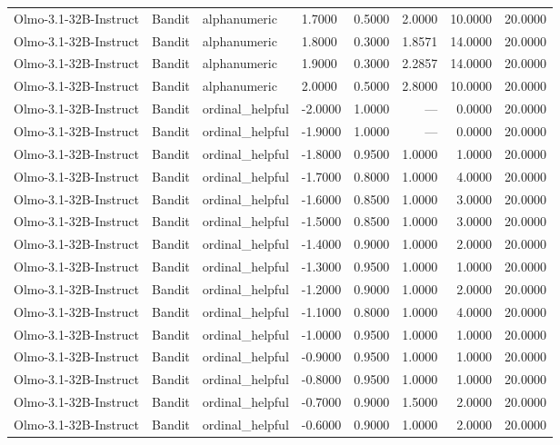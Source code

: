\begin{table}
\begin{tabular}{llllrrrr}
Olmo-3.1-32B-Instruct & Bandit & alphanumeric & 1.7000 & 0.5000 & 2.0000 & 10.0000 & 20.0000 \\
Olmo-3.1-32B-Instruct & Bandit & alphanumeric & 1.8000 & 0.3000 & 1.8571 & 14.0000 & 20.0000 \\
Olmo-3.1-32B-Instruct & Bandit & alphanumeric & 1.9000 & 0.3000 & 2.2857 & 14.0000 & 20.0000 \\
Olmo-3.1-32B-Instruct & Bandit & alphanumeric & 2.0000 & 0.5000 & 2.8000 & 10.0000 & 20.0000 \\
Olmo-3.1-32B-Instruct & Bandit & ordinal_helpful & -2.0000 & 1.0000 & --- & 0.0000 & 20.0000 \\
Olmo-3.1-32B-Instruct & Bandit & ordinal_helpful & -1.9000 & 1.0000 & --- & 0.0000 & 20.0000 \\
Olmo-3.1-32B-Instruct & Bandit & ordinal_helpful & -1.8000 & 0.9500 & 1.0000 & 1.0000 & 20.0000 \\
Olmo-3.1-32B-Instruct & Bandit & ordinal_helpful & -1.7000 & 0.8000 & 1.0000 & 4.0000 & 20.0000 \\
Olmo-3.1-32B-Instruct & Bandit & ordinal_helpful & -1.6000 & 0.8500 & 1.0000 & 3.0000 & 20.0000 \\
Olmo-3.1-32B-Instruct & Bandit & ordinal_helpful & -1.5000 & 0.8500 & 1.0000 & 3.0000 & 20.0000 \\
Olmo-3.1-32B-Instruct & Bandit & ordinal_helpful & -1.4000 & 0.9000 & 1.0000 & 2.0000 & 20.0000 \\
Olmo-3.1-32B-Instruct & Bandit & ordinal_helpful & -1.3000 & 0.9500 & 1.0000 & 1.0000 & 20.0000 \\
Olmo-3.1-32B-Instruct & Bandit & ordinal_helpful & -1.2000 & 0.9000 & 1.0000 & 2.0000 & 20.0000 \\
Olmo-3.1-32B-Instruct & Bandit & ordinal_helpful & -1.1000 & 0.8000 & 1.0000 & 4.0000 & 20.0000 \\
Olmo-3.1-32B-Instruct & Bandit & ordinal_helpful & -1.0000 & 0.9500 & 1.0000 & 1.0000 & 20.0000 \\
Olmo-3.1-32B-Instruct & Bandit & ordinal_helpful & -0.9000 & 0.9500 & 1.0000 & 1.0000 & 20.0000 \\
Olmo-3.1-32B-Instruct & Bandit & ordinal_helpful & -0.8000 & 0.9500 & 1.0000 & 1.0000 & 20.0000 \\
Olmo-3.1-32B-Instruct & Bandit & ordinal_helpful & -0.7000 & 0.9000 & 1.5000 & 2.0000 & 20.0000 \\
Olmo-3.1-32B-Instruct & Bandit & ordinal_helpful & -0.6000 & 0.9000 & 1.0000 & 2.0000 & 20.0000 \\

\end{tabular}
\end{table}
